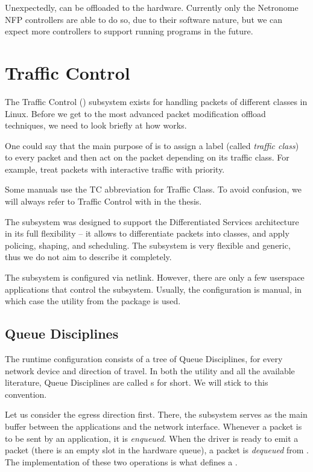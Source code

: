 Unexpectedly,  can be offloaded to the hardware. Currently only the
Netronome NFP controllers are able to do so, due to their software nature, but
we can expect more controllers to support running  programs in the future.

\section{Traffic Control}
\label{sec:tc}

\newcommand{\qdisc}{\a{qdisc}}

The Traffic Control () subsystem exists for handling packets of different
classes in Linux. Before we get to the most advanced packet modification offload
techniques, we need to look briefly at how  works.

One could say that the main purpose of  is to assign a label (called
\emph{traffic class}) to every packet and then act on the packet depending on
its traffic class. For example, treat packets with interactive traffic with
priority.

Some manuals use the TC abbreviation for Traffic Class. To avoid confusion, we
will always refer to Traffic Control with  in the thesis.

The  subsystem was designed to support the Differentiated Services architecture in
its full flexibility -- it allows to differentiate packets into classes, and apply
policing, shaping, and scheduling. The subsystem is very flexible and generic,
thus we do not aim to describe it completely.

The subsystem is configured via netlink. However, there are only a few
userspace applications that control the  subsystem. Usually, the
configuration is manual, in which case the  utility from the 
package is used.

\subsection{Queue Disciplines}

The  runtime configuration consists of a tree of Queue Disciplines, for
every network device and direction of travel. In both the  utility and
all the available literature, Queue Disciplines are called \qdisc{}s for short. We
will stick to this convention.

Let us consider the egress direction first. There, the  subsystem serves as the main buffer
between the applications and the network interface. Whenever a packet is to be sent
by an application, it is \emph{enqueued}. When the driver is ready to emit
a packet (there is an empty slot in the hardware queue), a packet is
\emph{dequeued} from . The implementation of these two operations is what
defines a \qdisc.

